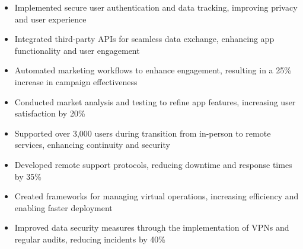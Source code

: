 \par\smallskip
\noindent
\begin{minipage}{20cm}
  \begin{minipage}{9.75cm}
    \begin{itemize}
      \item Implemented secure user authentication and data tracking, improving privacy and user experience
      \item Integrated third-party APIs for seamless data exchange, enhancing app functionality and user engagement
    \end{itemize}
  \end{minipage}
  \hfill
  \begin{minipage}{9.75cm}
    \begin{itemize}
      \item Automated marketing workflows to enhance engagement, resulting in a 25\% increase in campaign effectiveness
      \item Conducted market analysis and testing to refine app features, increasing user satisfaction by 20\%
    \end{itemize}
  \end{minipage}
\end{minipage}
\par\smallskip
\divider

\par\smallskip
\noindent
\begin{minipage}{20cm}
  \begin{minipage}{9.75cm}
    \begin{itemize}
      \item Supported over 3,000 users during transition from in-person to remote services, enhancing continuity and security
      \item Developed remote support protocols, reducing downtime and response times by 35\%
    \end{itemize}
  \end{minipage}
  \hfill
  \begin{minipage}{9.75cm}
    \begin{itemize}
      \item Created frameworks for managing virtual operations, increasing efficiency and enabling faster deployment
      \item Improved data security measures through the implementation of VPNs and regular audits, reducing incidents by 40\%
    \end{itemize}
  \end{minipage}
\end{minipage}

